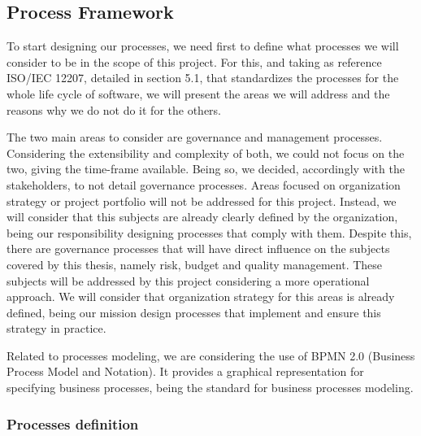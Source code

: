 \subsection{Process Framework}

To start designing our processes, we need first to define what processes we will consider to be in the scope of this project. For this, and taking as reference ISO/IEC 12207, detailed in section 5.1, that standardizes the processes for the whole life cycle of software, we will present the areas we will address and the reasons why we do not do it for the others.\par
The two main areas to consider are governance and management processes. Considering the extensibility and complexity of both, we could not focus on the two, giving the time-frame available. Being so, we decided, accordingly with the stakeholders, to not detail governance processes. Areas focused on organization strategy or project portfolio will not be addressed for this project. Instead, we will consider that this subjects are already clearly defined by the organization, being our responsibility designing processes that comply with them. 
Despite this, there are governance processes that will have direct influence on the subjects covered by this thesis, namely risk, budget and quality management. These subjects will be addressed by this project considering a more operational approach. We will consider that organization strategy for this areas is already defined, being our mission design processes that implement and ensure this strategy in practice.\par
Related to processes modeling, we are considering the use of BPMN 2.0 (Business Process Model and Notation). It provides a graphical representation for specifying business processes, being the standard for business processes modeling.\par


\subsubsection{Processes definition}


